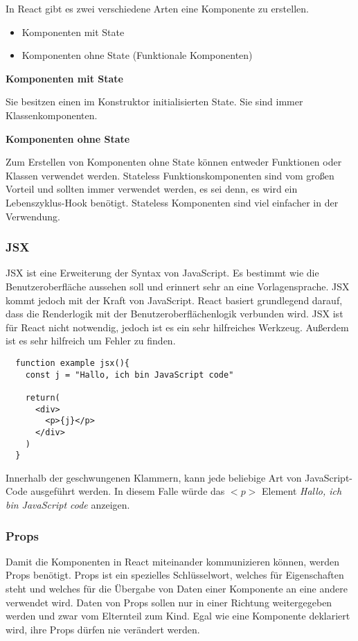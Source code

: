 In React gibt es zwei verschiedene Arten eine Komponente zu erstellen.
\begin{itemize}
  \item Komponenten mit State
  \item Komponenten ohne State (Funktionale Komponenten)\\
\end{itemize}

\centerline{\textbf{Komponenten mit State}}
Sie besitzen einen im Konstruktor initialisierten State. Sie sind immer Klassenkomponenten.\\

\centerline{\textbf{Komponenten ohne State}}
Zum Erstellen von Komponenten ohne State können entweder Funktionen oder Klassen verwendet werden.
Stateless Funktionskomponenten sind vom großen Vorteil und sollten immer verwendet werden, es sei 
denn, es wird ein Lebenszyklus-Hook benötigt. Stateless Komponenten sind viel einfacher in der
Verwendung.\cite{KompState} 

\subsubsection{JSX}
\label{jsx}
JSX ist eine Erweiterung der Syntax von JavaScript. Es bestimmt wie die Benutzeroberfläche aussehen soll
und erinnert sehr an eine Vorlagensprache. JSX kommt jedoch mit der Kraft von JavaScript. React basiert 
grundlegend darauf, dass die Renderlogik mit der Benutzeroberflächenlogik verbunden wird. JSX ist 
für React nicht notwendig, jedoch ist es ein sehr hilfreiches Werkzeug. 
Außerdem ist es sehr hilfreich um Fehler zu finden.
\begin{lstlisting}
  function example jsx(){
    const j = "Hallo, ich bin JavaScript code"

    return(
      <div>
        <p>{j}</p>
      </div>
    )
  }
\end{lstlisting}
Innerhalb der geschwungenen Klammern, kann jede beliebige Art von JavaScript-Code ausgeführt werden.
In diesem Falle würde das $<p>$ Element \textit{Hallo, ich bin JavaScript code} anzeigen.
~\cite{JSX}

\subsubsection{Props}

 Damit die Komponenten in React miteinander kommunizieren können, werden Props benötigt. Props ist ein
 spezielles Schlüsselwort, welches für Eigenschaften steht und welches für die Übergabe von 
 Daten einer Komponente an eine andere verwendet wird. Daten von Props sollen nur in einer 
 Richtung weitergegeben werden und zwar vom Elternteil zum Kind. Egal wie eine Komponente 
 deklariert wird, ihre Props dürfen nie verändert werden.\\

